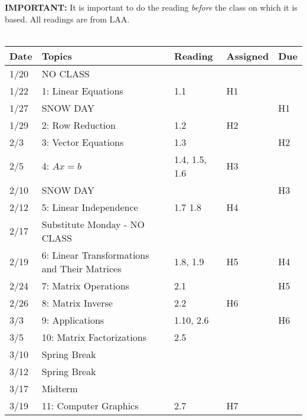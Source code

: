 \documentclass[11pt]{article}
\begin{document}
\textbf{IMPORTANT:} It is important to do the reading \emph{before} the class on
which it is based.   All readings are from LAA.
\\~\\
\small
\begin{centering}
\begin{tabular}{||l|p{3in}|l|l|l||}
\hline\hline
Date & Topics  & Reading & Assigned & Due  \\
\hline\hline
1/20 & NO CLASS &&& \\
1/22 & 1: Linear Equations & 1.1 & H1  & \\
\hline

1/27 & SNOW DAY &  & & H1 \\
1/29 & 2: Row Reduction & 1.2  & H2 & \\
\hline

2/3 & 3: Vector Equations & 1.3 & & H2 \\
2/5 & 4: $Ax = b$  & 1.4, 1.5, 1.6 & H3 & \\
\hline

2/10 & SNOW DAY & & & H3 \\
2/12 & 5: Linear Independence & 1.7 1.8 & H4 & \\ %
\hline

2/17 & Substitute Monday - NO CLASS & & &\\
2/19 & 6: Linear Transformations and Their Matrices  & 1.8, 1.9 & H5 & H4 \\
\hline

2/24 & 7: Matrix Operations  & 2.1 & & H5\\ 
2/26 & 8: Matrix Inverse & 2.2 & H6 &\\ 
\hline

3/3 & 9: Applications & 1.10, 2.6 & & H6 \\  
3/5 & 10: Matrix Factorizations & 2.5 & & \\ %
\hline

3/10 & Spring Break &&&\\
3/12 & Spring Break &&&\\
\hline

3/17 & Midterm & & &\\
3/19 & 11: Computer Graphics & 2.7 & H7 &\\ 
\hline


\end{tabular}
\end{centering}
\end{document}
